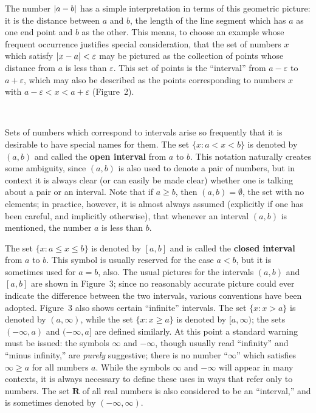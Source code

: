 The number $\lvert a-b\rvert$ has a simple interpretation in terms of this geometric
picture: it is the distance between $a$ and $b$, the length of the line segment
which has $a$ as one end point and $b$ as the other. This means, to choose an
example whose frequent occurrence justifies special consideration, that the set
of numbers $x$ which satisfy $\lvert x-a\rvert<\varepsilon$ may be pictured as the
collection of points whose distance from $a$ is less than $\varepsilon$. This
set of points is the ``interval'' from $a-\varepsilon$ to $a+\varepsilon$,
which may also be described as the points corresponding to numbers $x$ with
$a-\varepsilon<x<a+\varepsilon$ (Figure~2).

\begin{center}
\\[0.6em]
\end{center}

Sets of numbers which correspond to intervals arise so frequently that it is
desirable to have special names for them. The set $\{x:a<x<b\}$ is denoted by
$(a,b)$ and called the \textbf{open interval} from $a$ to $b$. This notation
naturally creates some ambiguity, since $(a,b)$ is also used to denote a pair
of numbers, but in context it is always clear (or can easily be made clear)
whether one is talking about a pair or an interval. Note that if $a\geq b$,
then $(a,b)=\emptyset$, the set with no elements; in practice, however, it is
almost always assumed (explicitly if one has been careful, and implicitly
otherwise), that whenever an interval $(a,b)$ is mentioned, the number $a$ is
less than $b$.

The set $\{x:a\leq x\leq b\}$ is denoted by $[a,b]$ and is called the
\textbf{closed interval} from $a$ to $b$. This symbol is usually reserved for
the case $a<b$, but it is sometimes used for $a=b$, also. The usual pictures
for the intervals $(a,b)$ and $[a,b]$ are shown in Figure~3; since no
reasonably accurate picture could ever indicate the difference between the two
intervals, various conventions have been adopted. Figure~3 also shows certain
``infinite'' intervals. The set $\{x:x>a\}$ is denoted by $(a,\infty)$, while
the set $\{x:x\geq a\}$ is denoted by $[a,\infty)$; the sets $(-\infty,a)$ and
$(-\infty,a]$ are defined similarly. At this point a standard warning must be
issued: the symbols $\infty$ and $-\infty$, though usually read ``infinity'' and
``minus infinity,'' are \emph{purely} suggestive; there is no number
``$\infty$'' which satisfies $\infty\geq a$ for all numbers $a$. While the
symbols $\infty$ and $-\infty$ will appear in many contexts, it is always
necessary to define these uses in ways that refer only to numbers. The set
$\mathbf{R}$ of all real numbers is also considered to be an ``interval,'' and
is sometimes denoted by $(-\infty,\infty)$.

